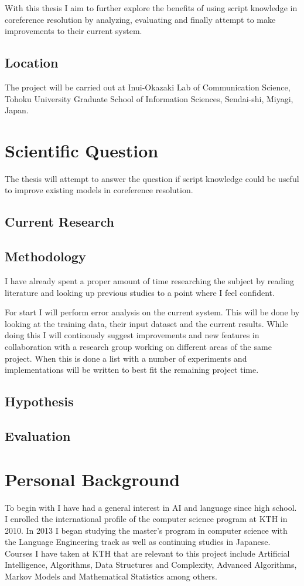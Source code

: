 \documentclass{article}
\begin{document}
With this thesis I aim to further explore the benefits of using script knowledge in coreference resolution by analyzing, evaluating and finally attempt to make improvements to their current system.
\subsection{Location}
The project will be carried out at Inui-Okazaki Lab of Communication Science, Tohoku University Graduate School of Information Sciences, Sendai-shi, Miyagi, Japan.
\section{Scientific Question}
The thesis will attempt to answer the question if script knowledge could be useful to improve existing models in coreference resolution.
\subsection{Current Research}

\subsection{Methodology}
I have already spent a proper amount of time researching the subject by reading literature and looking up previous studies to a point where I feel confident.

For start I will perform error analysis on the current system. This will be done by looking at the training data, their input dataset and the current results. While doing this I will continously suggest improvements and new features in collaboration with a research group working on different areas of the same project. When this is done a list with a number of experiments and implementations will be written to best fit the remaining project time.
\subsection{Hypothesis}

\subsection{Evaluation}

\section{Personal Background}
To begin with I have had a general interest in AI and language since high school. I enrolled the international profile of the computer science program at KTH in 2010. In 2013 I began studying the master's program in computer science with the Language Engineering track as well as continuing studies in Japanese. Courses I have taken at KTH that are relevant to this project include Artificial Intelligence, Algorithms, Data Structures and Complexity, Advanced Algorithms, Markov Models and Mathematical Statistics among others. 
\end{document}
